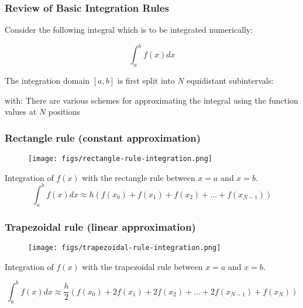 \documentclass[notes]{beamer}
\begin{document}
\begin{frame}
\frametitle{Review of Basic Integration Rules}
Consider the following integral which is to be integrated numerically:

\begin{equation*}
	\int_a^b f(x)dx
\end{equation*}

The integration domain $[a, b]$ is first split into $N$ equidistant subintervals:

with:
There are various schemes for approximating the integral using the function values at $N$ positions
\end{frame}

\begin{frame}
\frametitle{Rectangle rule (constant approximation)}
\begin{figure}[ht]
	\centering
	\texttt{[image: figs/rectangle-rule-integration.png]}
\end{figure}
Integration of $f(x)$ with the rectangle rule between $x = a$ and $x = b$.
\begin{equation*}
	\int_a^b f(x)dx \approx h (f(x_0) + f(x_1)+f(x_2)+\dots+f(x_{N-1}))
\end{equation*}
\end{frame}

\begin{frame}
\frametitle{Trapezoidal rule (linear approximation)}
\begin{figure}[ht]
	\centering
	\texttt{[image: figs/trapezoidal-rule-integration.png]}
\end{figure}
Integration of $f(x)$ with the trapezoidal rule between $x = a$ and $x = b$.

\begin{equation*}
	\int_a^b f(x)dx \approx \frac{h}{2} (f(x_0) + 2f(x_1)+2f(x_2)+\dots+ 2f(x_{N-1}) + f(x_N))
\end{equation*}
\end{frame}
\end{document}
